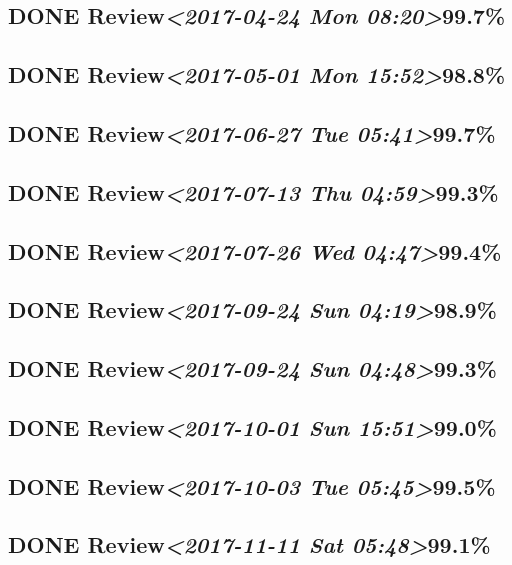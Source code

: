 \documentclass[11pt]{ctexart}
\begin{document}
\subsection{{\bfseries\sffamily DONE} Review\textit{<2017-04-24 Mon 08:20>}99.7\%}
\label{sec:orge640f33}
\subsection{{\bfseries\sffamily DONE} Review\textit{<2017-05-01 Mon 15:52>}98.8\%}
\label{sec:org9718d3f}
\subsection{{\bfseries\sffamily DONE} Review\textit{<2017-06-27 Tue 05:41>}99.7\%}
\label{sec:orga2aeccd}
\subsection{{\bfseries\sffamily DONE} Review\textit{<2017-07-13 Thu 04:59>}99.3\%}
\label{sec:org1ce4191}
\subsection{{\bfseries\sffamily DONE} Review\textit{<2017-07-26 Wed 04:47>}99.4\%}
\label{sec:orge2e9f06}
\subsection{{\bfseries\sffamily DONE} Review\textit{<2017-09-24 Sun 04:19>}98.9\%}
\label{sec:org9bc837c}
\subsection{{\bfseries\sffamily DONE} Review\textit{<2017-09-24 Sun 04:48>}99.3\%}
\label{sec:org21a8aca}
\subsection{{\bfseries\sffamily DONE} Review\textit{<2017-10-01 Sun 15:51>}99.0\%}
\label{sec:org65a4cd8}
\subsection{{\bfseries\sffamily DONE} Review\textit{<2017-10-03 Tue 05:45>}99.5\%}
\label{sec:orgf7e00c4}

\subsection{{\bfseries\sffamily DONE} Review\textit{<2017-11-11 Sat 05:48>}99.1\%}
\label{sec:org44e6406}
\end{document}

